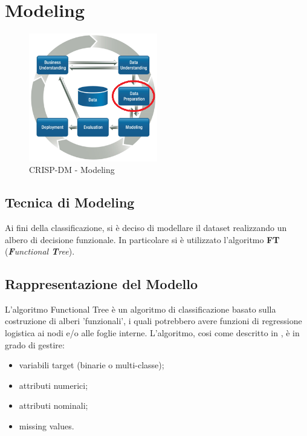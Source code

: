 \chapter{Modeling}

\begin{figure}[hbtp]
	\centering
	\includegraphics[width=0.5\textwidth]{./images/CRISPDM_3.png}
	\caption{CRISP-DM - Modeling}
	\label{CRISPDM_4}
\end{figure}

\section{Tecnica di Modeling}
Ai fini della classificazione, si è deciso di modellare il dataset realizzando un albero di decisione funzionale. In particolare si è utilizzato l'algoritmo \textbf{FT} (\textit{\textbf{F}unctional \textbf{T}ree}).

\section{Rappresentazione del Modello}
L'algoritmo Functional Tree è un algoritmo di classificazione basato sulla costruzione di alberi 'funzionali', i quali potrebbero avere funzioni di regressione logistica ai nodi e/o alle foglie interne. L'algoritmo, cosi come descritto in \cite{Gama2004}, è in grado di gestire:
\begin{itemize}
	\item variabili target (binarie o multi-classe);
	\item attributi numerici;
	\item attributi nominali;
	\item missing values.
\end{itemize}

